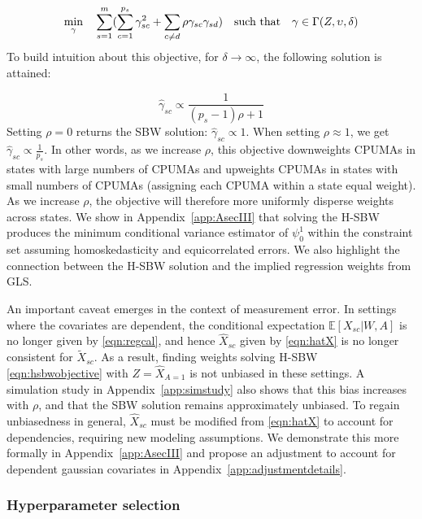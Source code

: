 \documentclass[aoas]{imsart}
\theoremstyle{plain}
\theoremstyle{remark}
\begin{document}
\begin{equation}\label{eqn:hsbwobjective}
\min_{\gamma} \quad \sum_{s=1}^{m}(\sum_{c = 1}^{p_s}\gamma_{sc}^2 + \sum_{c \ne d}\rho \gamma_{sc}\gamma_{sd}) \quad \text{such that} \quad \gamma \in \Gamma(Z, \upsilon, \delta)\\
\end{equation}
To build intuition about this objective, for $\delta \to \infty$, the following solution is attained:

\begin{equation}\label{eqn:sbwsol}
\hat{\gamma}_{sc} \propto \frac{1}{(p_s - 1)\rho + 1}
\end{equation}
Setting $\rho = 0$ returns the SBW solution: $\hat{\gamma}_{sc} \propto 1$. When setting $\rho \approx 1$, we get $\hat{\gamma}_{sc} \propto \frac{1}{p_s}$. In other words, as we increase $\rho$, this objective downweights CPUMAs in states with large numbers of CPUMAs and upweights CPUMAs in states with small numbers of CPUMAs (assigning each CPUMA within a state equal weight). As we increase $\rho$, the objective will therefore more uniformly disperse weights across states. We show in Appendix~\ref{app:AsecIII} that solving the H-SBW produces the minimum conditional variance estimator of $\psi_0^1$ within the constraint set assuming homoskedasticity and equicorrelated errors. We also highlight the connection between the H-SBW solution and the implied regression weights from GLS.

An important caveat emerges in the context of measurement error. In settings where the covariates are dependent, the conditional expectation $\mathbb{E}[X_{sc}|W,A]$ is no longer given by \eqref{eqn:regcal}, and hence $\hat{X}_{sc}$ given by \eqref{eqn:hatX} is no longer consistent for $\tilde{X}_{sc}$. As a result, finding weights solving H-SBW \eqref{eqn:hsbwobjective} with $Z = \hat{X}_{A=1}$ is not unbiased in these settings. A simulation study in Appendix~\ref{app:simstudy} also shows that this bias increases with $\rho$, and that the SBW solution remains approximately unbiased. To regain unbiasedness in general, $\hat{X}_{sc}$ must be modified from \eqref{eqn:hatX} to account for dependencies, requiring new modeling assumptions. We demonstrate this more formally in Appendix~\ref{app:AsecIII} and propose an adjustment to account for dependent gaussian covariates in Appendix~\ref{app:adjustmentdetails}.

\subsubsection{Hyperparameter selection} \label{ssec:delta}
\end{document}
